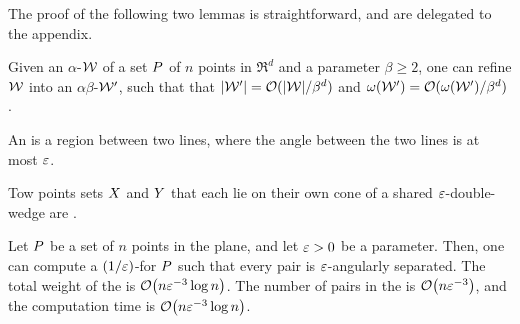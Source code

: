 \documentclass[12pt]{article}%
\begin{document}
The proof of the following two lemmas is straightforward, and are
delegated to the appendix.

\SaveContent{\LemmaChopEasyBody}%
{%
   Given an $\alpha$-\SSPD $\mathcal{W}$ of a set $P$ of $n$ points in
   $\Re^d$ and a parameter $\beta \geq 2$, one can refine $\mathcal{W}$ into
   an $\alpha\beta$-\SSPD $\mathcal{W}'$, such that that
   $|\mathcal{W}'| = \mathcal{O}(|\mathcal{W}|/\beta^d)$ and
   $\WeightX{\WS'} = \Of(\WeightX{\WS'}/\beta^d)$.  }
 
\begin{lemma}
    \LemmaChopEasyBody{}
\end{lemma}

\begin{defn}%
    An  is a region between two lines,
    where the angle between the two lines is at most $\varepsilon$.

    Tow points sets $X$ and $Y$ that each lie on their own cone of
    a shared $\varepsilon$-double-wedge are .
\end{defn}




\begin{lemma}
    \LemmaRefineDWBody{}%
\end{lemma}

\begin{corollary}
    Let $P$ be a set of $n$ points in the plane, and let $\varepsilon > 0$
    be a parameter. Then, one can compute a $(1/\varepsilon)$-\SSPD for $P$
    such that every pair is $\varepsilon$-angularly separated.  The total
    weight of the \SSPD is $\Of\pth{n \eps^{-3} \log n}$. The number
    of pairs in the \SSPD is $\Of\pth{n \eps^{-3}}$, and the
    computation time is $\Of\pth{ n \eps^{-3} \log n }$.
\end{corollary}
\end{document}
